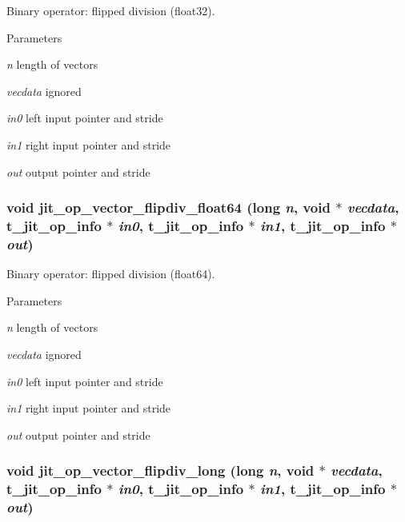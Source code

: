 Binary operator: flipped division (float32). 
\begin{DoxyParams}{Parameters}
\item[{\em n}]length of vectors \item[{\em vecdata}]ignored \item[{\em in0}]left input pointer and stride \item[{\em in1}]right input pointer and stride \item[{\em out}]output pointer and stride \end{DoxyParams}
\hypertarget{group__opvecmod_gac322162e3b3e0a31c8b9aa5739de8f00}{
\subsubsection[{jit\_\-op\_\-vector\_\-flipdiv\_\-float64}]{\setlength{\rightskip}{0pt plus 5cm}void jit\_\-op\_\-vector\_\-flipdiv\_\-float64 (long {\em n}, \/  void $\ast$ {\em vecdata}, \/  {\bf t\_\-jit\_\-op\_\-info} $\ast$ {\em in0}, \/  {\bf t\_\-jit\_\-op\_\-info} $\ast$ {\em in1}, \/  {\bf t\_\-jit\_\-op\_\-info} $\ast$ {\em out})}}
\label{group__opvecmod_gac322162e3b3e0a31c8b9aa5739de8f00}


Binary operator: flipped division (float64). 
\begin{DoxyParams}{Parameters}
\item[{\em n}]length of vectors \item[{\em vecdata}]ignored \item[{\em in0}]left input pointer and stride \item[{\em in1}]right input pointer and stride \item[{\em out}]output pointer and stride \end{DoxyParams}
\hypertarget{group__opvecmod_gac88aff075d135ad68d64506f0127e788}{
\subsubsection[{jit\_\-op\_\-vector\_\-flipdiv\_\-long}]{\setlength{\rightskip}{0pt plus 5cm}void jit\_\-op\_\-vector\_\-flipdiv\_\-long (long {\em n}, \/  void $\ast$ {\em vecdata}, \/  {\bf t\_\-jit\_\-op\_\-info} $\ast$ {\em in0}, \/  {\bf t\_\-jit\_\-op\_\-info} $\ast$ {\em in1}, \/  {\bf t\_\-jit\_\-op\_\-info} $\ast$ {\em out})}}
\label{group__opvecmod_gac88aff075d135ad68d64506f0127e788}


